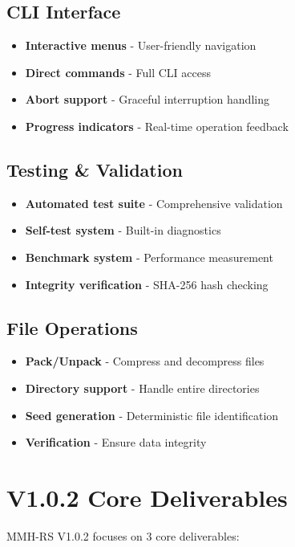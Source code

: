 \documentclass[11pt,a4paper]{article}
\begin{document}
	\subsection{CLI Interface}
	\begin{itemize}
		\item \textbf{Interactive menus} - User-friendly navigation
		\item \textbf{Direct commands} - Full CLI access
		\item \textbf{Abort support} - Graceful interruption handling
		\item \textbf{Progress indicators} - Real-time operation feedback
	\end{itemize}

	\subsection{Testing \& Validation}
	\begin{itemize}
		\item \textbf{Automated test suite} - Comprehensive validation
		\item \textbf{Self-test system} - Built-in diagnostics
		\item \textbf{Benchmark system} - Performance measurement
		\item \textbf{Integrity verification} - SHA-256 hash checking
	\end{itemize}

	\subsection{File Operations}
	\begin{itemize}
		\item \textbf{Pack/Unpack} - Compress and decompress files
		\item \textbf{Directory support} - Handle entire directories
		\item \textbf{Seed generation} - Deterministic file identification
		\item \textbf{Verification} - Ensure data integrity
	\end{itemize}

	\section{V1.0.2 Core Deliverables}
	\label{sec:deliverables}

	MMH-RS V1.0.2 focuses on 3 core deliverables:
\end{document}

